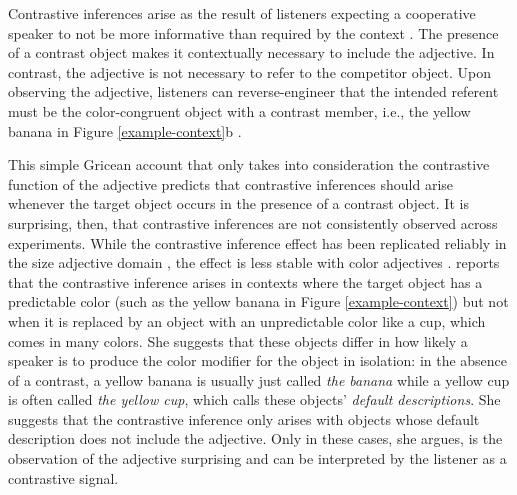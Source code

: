 \documentclass[10pt,letterpaper]{article}
\newcommand{\ek}[1]{\textcolor{Orange}{[ek: #1]}}
\newcommand{\figref}[1]{Figure \ref{#1}}
\begin{document}

Contrastive inferences arise as the result of listeners expecting a cooperative speaker to not be more informative than required by the context \cite{Grice:1975}. The presence of a contrast object makes it contextually necessary to include the adjective. In contrast, the adjective is not necessary to refer to the competitor object. Upon observing the adjective, listeners can reverse-engineer that the intended referent must be the color-congruent object with a contrast member, i.e., the yellow banana in \figref{example-context}b \cite{Aparicio:2018,Grodner:2011,Ryskin:2019,Sedivy:1999}.

This simple Gricean account that only takes into consideration the contrastive function of the adjective predicts that contrastive inferences should arise whenever the target object occurs in the presence of a contrast object. It is surprising, then, that contrastive inferences are not consistently observed across experiments. While the contrastive inference effect has been replicated reliably in the size adjective domain \cite{Aparicio:2018,Grodner:2011,Ryskin:2019,Sedivy:1999}, the effect is less stable with color adjectives \cite{Sedivy:2003}.  reports that the contrastive inference arises in contexts where the target object has a predictable color (such as the yellow banana in \figref{example-context}) but not when it is replaced by an object with an unpredictable color like a cup, which comes in many colors.
She suggests that these objects differ in how likely a speaker is to produce the color modifier for the object in isolation: in the absence of a contrast, a yellow banana is usually just called \textit{the banana} while a yellow cup is often called \textit{the yellow cup}, which  calls these objects' \emph{default descriptions}. She suggests that the contrastive inference only arises with objects whose default description does not include the adjective. Only in these cases, she argues, is the observation of the adjective surprising and can be interpreted by the listener as a contrastive signal.
\end{document}
